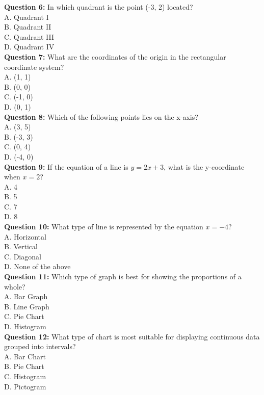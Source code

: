 \documentclass{article}
\begin{document}
\textbf{Question 6:} In which quadrant is the point (-3, 2) located? \\
A. Quadrant I \\
B. Quadrant II \\
C. Quadrant III \\
D. Quadrant IV \\

\textbf{Question 7:} What are the coordinates of the origin in the rectangular coordinate system? \\
A. (1, 1) \\
B. (0, 0) \\
C. (-1, 0) \\
D. (0, 1) \\

\textbf{Question 8:} Which of the following points lies on the x-axis? \\
A. (3, 5) \\
B. (-3, 3) \\
C. (0, 4) \\
D. (-4, 0) \\

\textbf{Question 9:} If the equation of a line is \( y = 2x + 3 \), what is the y-coordinate when \( x = 2 \)? \\
A. 4 \\
B. 5 \\
C. 7 \\
D. 8 \\

\textbf{Question 10:} What type of line is represented by the equation \( x = -4 \)? \\
A. Horizontal \\
B. Vertical \\
C. Diagonal \\
D. None of the above \\


\textbf{Question 11:} Which type of graph is best for showing the proportions of a whole? \\
A. Bar Graph \\
B. Line Graph \\
C. Pie Chart \\
D. Histogram \\

\textbf{Question 12:} What type of chart is most suitable for displaying continuous data grouped into intervals? \\
A. Bar Chart \\
B. Pie Chart \\
C. Histogram \\
D. Pictogram \\
\end{document}
